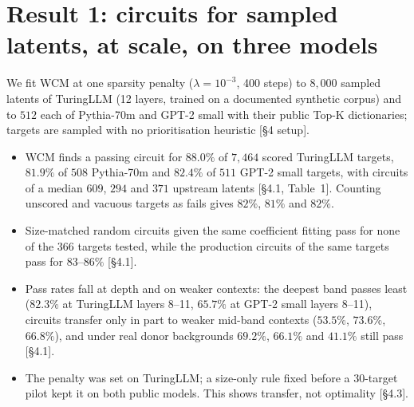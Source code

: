 \documentclass[10pt]{article}
\newcommand{\paperref}[1]{{\small[#1]}}
\begin{document}
\section*{Result 1: circuits for sampled latents, at scale, on three models}
We fit WCM at one sparsity penalty ($\lambda = 10^{-3}$, 400 steps) to $8{,}000$ sampled latents of TuringLLM (12 layers, trained on a documented synthetic corpus) and to $512$ each of Pythia-70m and GPT-2 small with their public Top-K dictionaries; targets are sampled with no prioritisation heuristic \paperref{§4 setup}.
\begin{itemize}
  \item WCM finds a passing circuit for $\mathbf{88.0\%}$ of $7{,}464$ scored TuringLLM targets, $\mathbf{81.9\%}$ of $508$ Pythia-70m and $\mathbf{82.4\%}$ of $511$ GPT-2 small targets, with circuits of a median $609$, $294$ and $371$ upstream latents \paperref{§4.1, Table~1}. Counting unscored and vacuous targets as fails gives $82\%$, $81\%$ and $82\%$.
  \item Size-matched random circuits given the same coefficient fitting pass for none of the $366$ targets tested, while the production circuits of the same targets pass for $83$--$86\%$ \paperref{§4.1}.
  \item Pass rates fall at depth and on weaker contexts: the deepest band passes least ($82.3\%$ at TuringLLM layers 8--11, $65.7\%$ at GPT-2 small layers 8--11), circuits transfer only in part to weaker mid-band contexts ($53.5\%$, $73.6\%$, $66.8\%$), and under real donor backgrounds $69.2\%$, $66.1\%$ and $41.1\%$ still pass \paperref{§4.1}.
  \item The penalty was set on TuringLLM; a size-only rule fixed before a 30-target pilot kept it on both public models. This shows transfer, not optimality \paperref{§4.3}.
\end{itemize}
\end{document}
